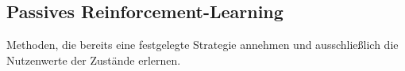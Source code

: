 \subsection{Passives Reinforcement-Learning}
\label{passivesRL}

Methoden, die bereits eine festgelegte Strategie annehmen und ausschließlich die Nutzenwerte der Zustände erlernen.\\